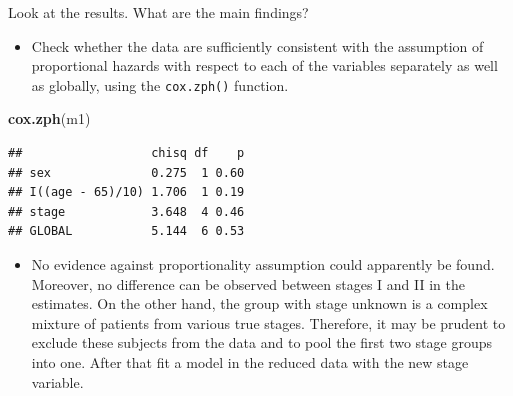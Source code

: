 \documentclass[
]{book}
\newenvironment{Shaded}{\begin{snugshade}}{\end{snugshade}}
\newcommand{\AttributeTok}[1]{\textcolor[rgb]{0.13,0.29,0.53}{#1}}
\newcommand{\DecValTok}[1]{\textcolor[rgb]{0.00,0.00,0.81}{#1}}
\newcommand{\FunctionTok}[1]{\textcolor[rgb]{0.13,0.29,0.53}{\textbf{#1}}}
\newcommand{\NormalTok}[1]{#1}
\newcommand{\OtherTok}[1]{\textcolor[rgb]{0.56,0.35,0.01}{#1}}
\newcommand{\SpecialCharTok}[1]{\textcolor[rgb]{0.81,0.36,0.00}{\textbf{#1}}}
\newcommand{\StringTok}[1]{\textcolor[rgb]{0.31,0.60,0.02}{#1}}
\providecommand{\tightlist}{%
  \setlength{\itemsep}{0pt}\setlength{\parskip}{0pt}}
\begin{document}
Look at the results. What are the main findings?

\begin{itemize}
\tightlist
\item
  Check whether the data are sufficiently consistent with the
  assumption of proportional hazards with respect to each of
  the variables separately
  as well as globally, using the \texttt{cox.zph()} function.
\end{itemize}

\begin{Shaded}
\begin{Highlighting}[]
\FunctionTok{cox.zph}\NormalTok{(m1)}
\end{Highlighting}
\end{Shaded}

\begin{verbatim}
##                  chisq df    p
## sex              0.275  1 0.60
## I((age - 65)/10) 1.706  1 0.19
## stage            3.648  4 0.46
## GLOBAL           5.144  6 0.53
\end{verbatim}

\begin{itemize}
\tightlist
\item
  No evidence against proportionality assumption could apparently be found.
  Moreover, no difference can be observed between stages I and II in the estimates.
  On the other hand, the
  group with stage unknown is a complex mixture of patients from various
  true stages. Therefore, it may be prudent to exclude these subjects from the data
  and to pool the first two stage groups into one. After that fit a model in
  the reduced data with the new stage variable.
\end{itemize}

\begin{Shaded}
\end{Shaded}
\end{document}
